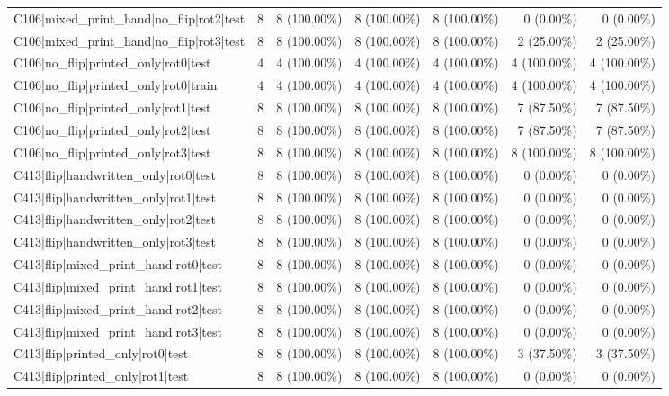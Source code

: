 \begin{longtable}{>{\raggedright\arraybackslash}p{5cm}rrrrrr}
C106|mixed\_print\_hand|no\_flip|rot2|test & 8 & 8 (100.00\%) & 8 (100.00\%) & 8 (100.00\%) & 0 (0.00\%) & 0 (0.00\%) \\
C106|mixed\_print\_hand|no\_flip|rot3|test & 8 & 8 (100.00\%) & 8 (100.00\%) & 8 (100.00\%) & 2 (25.00\%) & 2 (25.00\%) \\
C106|no\_flip|printed\_only|rot0|test & 4 & 4 (100.00\%) & 4 (100.00\%) & 4 (100.00\%) & 4 (100.00\%) & 4 (100.00\%) \\
C106|no\_flip|printed\_only|rot0|train & 4 & 4 (100.00\%) & 4 (100.00\%) & 4 (100.00\%) & 4 (100.00\%) & 4 (100.00\%) \\
C106|no\_flip|printed\_only|rot1|test & 8 & 8 (100.00\%) & 8 (100.00\%) & 8 (100.00\%) & 7 (87.50\%) & 7 (87.50\%) \\
C106|no\_flip|printed\_only|rot2|test & 8 & 8 (100.00\%) & 8 (100.00\%) & 8 (100.00\%) & 7 (87.50\%) & 7 (87.50\%) \\
C106|no\_flip|printed\_only|rot3|test & 8 & 8 (100.00\%) & 8 (100.00\%) & 8 (100.00\%) & 8 (100.00\%) & 8 (100.00\%) \\
C413|flip|handwritten\_only|rot0|test & 8 & 8 (100.00\%) & 8 (100.00\%) & 8 (100.00\%) & 0 (0.00\%) & 0 (0.00\%) \\
C413|flip|handwritten\_only|rot1|test & 8 & 8 (100.00\%) & 8 (100.00\%) & 8 (100.00\%) & 0 (0.00\%) & 0 (0.00\%) \\
C413|flip|handwritten\_only|rot2|test & 8 & 8 (100.00\%) & 8 (100.00\%) & 8 (100.00\%) & 0 (0.00\%) & 0 (0.00\%) \\
C413|flip|handwritten\_only|rot3|test & 8 & 8 (100.00\%) & 8 (100.00\%) & 8 (100.00\%) & 0 (0.00\%) & 0 (0.00\%) \\
C413|flip|mixed\_print\_hand|rot0|test & 8 & 8 (100.00\%) & 8 (100.00\%) & 8 (100.00\%) & 0 (0.00\%) & 0 (0.00\%) \\
C413|flip|mixed\_print\_hand|rot1|test & 8 & 8 (100.00\%) & 8 (100.00\%) & 8 (100.00\%) & 0 (0.00\%) & 0 (0.00\%) \\
C413|flip|mixed\_print\_hand|rot2|test & 8 & 8 (100.00\%) & 8 (100.00\%) & 8 (100.00\%) & 0 (0.00\%) & 0 (0.00\%) \\
C413|flip|mixed\_print\_hand|rot3|test & 8 & 8 (100.00\%) & 8 (100.00\%) & 8 (100.00\%) & 0 (0.00\%) & 0 (0.00\%) \\
C413|flip|printed\_only|rot0|test & 8 & 8 (100.00\%) & 8 (100.00\%) & 8 (100.00\%) & 3 (37.50\%) & 3 (37.50\%) \\
C413|flip|printed\_only|rot1|test & 8 & 8 (100.00\%) & 8 (100.00\%) & 8 (100.00\%) & 0 (0.00\%) & 0 (0.00\%) \\

\end{longtable}
